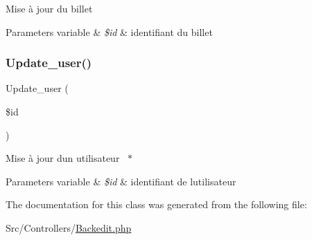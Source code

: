 Mise à jour du billet 
\begin{DoxyParams}[1]{Parameters}
variable & {\em \$id} & identifiant du billet \\
\hline
\end{DoxyParams}
\mbox{\label{class_src_1_1_controllers_1_1_backedit_ac76a9db7f422d94f155c99c21540da0e}} 
\subsubsection{\texorpdfstring{Update\+\_\+user()}{Update\_user()}}
{\footnotesize\ttfamily Update\+\_\+user (\begin{DoxyParamCaption}\item[{}]{\$id }\end{DoxyParamCaption})}

Mise à jour d\textquotesingle{}un utilisateur  $\ast$
\begin{DoxyParams}[1]{Parameters}
variable & {\em \$id} & identifiant de l\textquotesingle{}utilisateur \\
\hline
\end{DoxyParams}


The documentation for this class was generated from the following file\+:\begin{DoxyCompactItemize}
\item 
Src/\+Controllers/\hyperlink{_backedit_8php}{Backedit.\+php}\end{DoxyCompactItemize}
